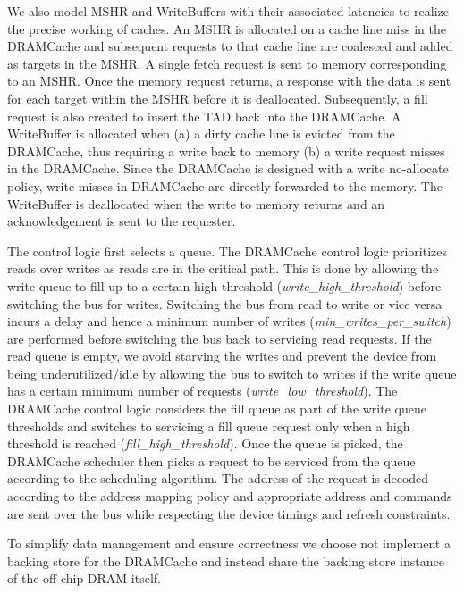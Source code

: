 \par We also model MSHR and WriteBuffers with their associated latencies to realize the precise working of caches. An MSHR is allocated on a cache line miss in the DRAMCache and subsequent requests to that cache line are coalesced and added as targets in the MSHR. A single fetch request is sent to memory corresponding to an MSHR. Once the memory request returns, a response with the data is sent for each target within the MSHR before it is deallocated. Subsequently, a fill request is also created to insert the TAD back into the DRAMCache. 
A WriteBuffer is allocated when (a) a dirty cache line is evicted from the DRAMCache, thus requiring a write back to memory (b) a write request misses in the DRAMCache. Since the DRAMCache is designed with a write no-allocate policy, write misses in DRAMCache are directly forwarded to the memory. The WriteBuffer is deallocated when the write to memory returns and an acknowledgement is sent to the requester. 
\par The control logic first selects a queue. The DRAMCache control logic prioritizes reads over writes as reads are in the critical path. This is done by allowing the write queue to fill up to a certain high threshold (\textit{write\_high\_threshold}) before switching the bus for writes. Switching the bus from read to write or vice versa incurs a delay and hence a minimum number of writes (\textit{min\_writes\_per\_switch}) are performed before switching the bus back to servicing read requests. If the read queue is empty, we avoid starving the writes and prevent the device from being underutilized/idle by allowing the bus to switch to writes if the write queue has a certain minimum number of requests (\textit{write\_low\_threshold}). The DRAMCache control logic considers the fill queue as part of the write queue thresholds and switches to servicing a fill queue request only when a high threshold is reached (\textit{fill\_high\_threshold}). Once the queue is picked, the DRAMCache scheduler then picks a request to be serviced from the queue according to the scheduling algorithm. The address of the request is decoded according to the  address mapping policy and appropriate address and commands are sent over the bus while respecting the device timings and refresh constraints.
\par To simplify data management and ensure correctness we choose not implement a backing store for the DRAMCache and instead share the backing store instance of the off-chip DRAM itself.


